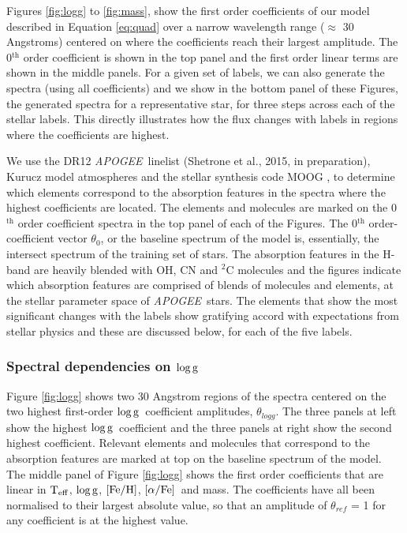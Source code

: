 \documentclass[12pt, preprint]{aastex}
\newcommand{\project}[1]{\textsl{#1}}
\newcommand{\apogee}{\project{APOGEE}}
\newcommand{\teff}{\mbox{$\rm T_{eff}$}}
\newcommand{\feh}{\mbox{$\rm [Fe/H]$}}
\newcommand{\alphafe}{\mbox{$\rm [\alpha/Fe]$}}
\newcommand{\logg}{\mbox{$\rm \log g$}}
\begin{document}
Figures \ref{fig:logg} to \ref{fig:mass}, show the first order coefficients of our model described in Equation \ref{eq:quad} over a narrow wavelength range ($\approx$ 30 Angstroms) centered on where the coefficients reach their largest amplitude. The 0$^{\mbox{th}}$ order coefficient is shown in the top panel and the first order linear terms are shown in the middle panels. For a given set of labels, we can also generate the spectra (using all coefficients) and we  show in the bottom panel of these Figures, the generated spectra for a representative star, for three steps across each of the stellar labels. This directly illustrates how the flux changes with labels in regions where the coefficients are highest.  

We use the DR12 \apogee\ linelist (Shetrone et al., 2015, in preparation), Kurucz model atmospheres \citep{castelli2004} and the stellar synthesis code MOOG \citep{sneden1979}, to determine which elements correspond to the absorption features in the spectra where the highest coefficients are located. The elements and molecules are marked on the 0$^{\mbox{th}}$ order coefficient spectra in the top panel of each of the Figures. The 0$^{\mbox{th}}$ order-coefficient vector $\theta_0$, or the baseline spectrum of the model is, essentially, the intersect spectrum of the training set of stars. The absorption features in the H-band are heavily blended with OH, CN and $^2$C molecules and the figures indicate which absorption features are comprised of blends of molecules and elements, at the stellar parameter space of \apogee\ stars. The elements that show the most significant changes with the labels show gratifying accord with expectations from stellar physics and these are discussed below, for each of the five labels. 

\subsubsection{Spectral dependencies on \logg} 

Figure \ref{fig:logg} shows two 30 Angstrom regions of the spectra centered on the two highest first-order \logg\ coefficient amplitudes, $\theta_{logg}$. The three panels at left show the highest \logg\ coefficient and the three panels at right show the second highest coefficient. Relevant elements and molecules that correspond to the absorption features are marked at top on the baseline spectrum of the model.  The middle panel of Figure \ref{fig:logg} shows the first order coefficients that are linear in \teff, \logg, \feh, \alphafe\ and mass. The coefficients have all been normalised to their largest absolute value, so that an amplitude of $\theta_{ref}$ = 1 for any coefficient is at the highest value.  
\end{document}
